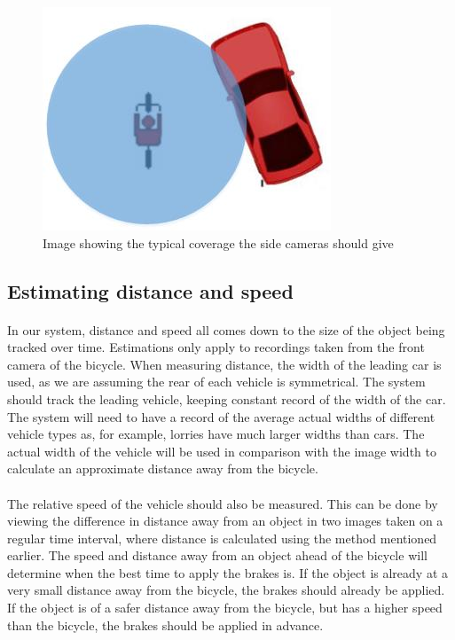 \documentclass[a4paper]{report}
\begin{document}
{\begin{figure}[H]
\centering
\includegraphics[scale=0.6]{figures/final_design/bicycle_safe_zone}
\caption{Image showing the typical coverage the side cameras should give}
\label{fig:safe_zone}
\end{figure}

\subsection{Estimating distance and speed}
\paragraph{}In our system, distance and speed all comes down to the size of the object being tracked over time. Estimations only apply to recordings taken from the front camera of the bicycle. When measuring distance, the width of the leading car is used, as we are assuming the rear of each vehicle is symmetrical. The system should track the leading vehicle, keeping constant record of the width of the car. The system will need to have a record of the average actual widths of different vehicle types as, for example, lorries have much larger widths than cars. The actual width of the vehicle will be used in comparison with the image width to calculate an approximate distance away from the bicycle. 

\paragraph{}The relative speed of the vehicle should also be measured. This can be done by viewing the difference in distance away from an object in two images taken on a regular time interval, where distance is calculated using the method mentioned earlier. The speed and distance away from an object ahead of the bicycle will determine when the best time to apply the brakes is. If the object is already at a very small distance away from the bicycle, the brakes should already be applied. If the object is of a safer distance away from the bicycle, but has a higher speed than the bicycle, the brakes should be applied in advance.

}
\end{document}

